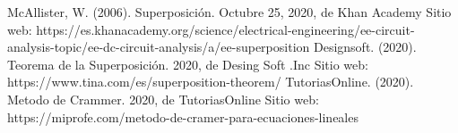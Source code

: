 \documentclass[12pt]{article}
\begin{document}
\begin{thebibliography}{1}
McAllister, W. (2006). Superposición. Octubre 25, 2020, de Khan Academy Sitio web: https://es.khanacademy.org/science/electrical-engineering/ee-circuit-analysis-topic/ee-dc-circuit-analysis/a/ee-superposition
Designsoft. (2020). Teorema de la Superposición. 2020, de Desing Soft .Inc Sitio web: https://www.tina.com/es/superposition-theorem/
TutoriasOnline. (2020). Metodo de Crammer. 2020, de TutoriasOnline Sitio web: https://miprofe.com/metodo-de-cramer-para-ecuaciones-lineales
\end{thebibliography}




\end{document}
